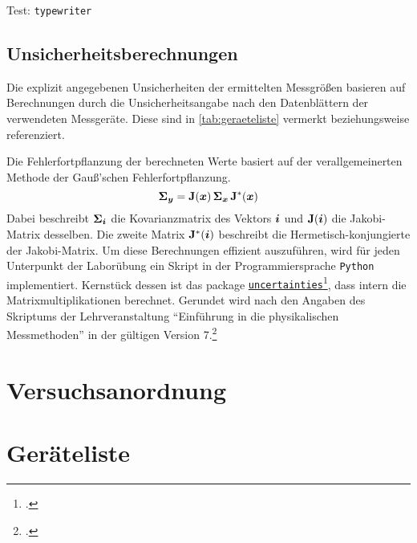 \documentclass[ngerman]{scrartcl}
\begin{document}
Test: \texttt{typewriter}

\subsection{Unsicherheitsberechnungen}
\label{subsec:unsicherheitsberechnungen}

Die explizit angegebenen Unsicherheiten der ermittelten Messgrößen basieren auf Berechnungen durch die Unsicherheitsangabe nach den Datenblättern der verwendeten Messgeräte. Diese sind in \autoref{tab:geraeteliste} vermerkt beziehungsweise referenziert.

Die Fehlerfortpflanzung der berechneten Werte basiert auf der verallgemeinerten Methode der Gauß'schen Fehlerfortpflanzung.
\[\vb*{\Sigma}_{\vb*{y}} = \vb{J}(\vb*{x}) \, \vb*{\Sigma}_{\vb*{x}} \, \vb{J}^*(\vb*{x})\]
Dabei beschreibt $\displaystyle \vb*{\Sigma}_{\vb*{i}}$ die Kovarianzmatrix des Vektors $\vb*{i}$ und $\vb{J}(\vb*{i})$ die Jakobi-Matrix desselben. Die zweite Matrix $\vb{J}^*(\vb*{i})$ beschreibt die Hermetisch-konjungierte der Jakobi-Matrix. Um diese Berechnungen effizient auszuführen, wird für jeden Unterpunkt der Laborübung ein Skript in der Programmiersprache \texttt{Python} implementiert. Kernstück dessen ist das package \href{https://github.com/lebigot/uncertainties}{\texttt{uncertainties}}\footcite{ref:uncertainties}, dass intern die Matrixmultiplikationen berechnet. Gerundet wird nach den Angaben des Skriptums der Lehrveranstaltung \enquote{Einführung in die physikalischen Messmethoden} in der gültigen Version 7.\footcite{ref:messmethoden}



\section{Versuchsanordnung}
\label{sec:versuchsanordnung}



\section{Geräteliste}
\label{sec:geraeteliste}
\end{document}
